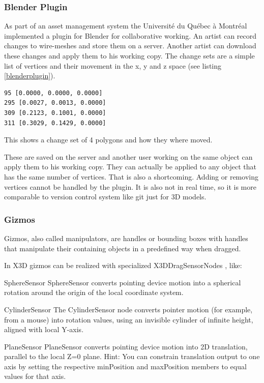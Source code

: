 \subsubsection{Blender Plugin}
\label{blender-plugin}

As part of an asset management system the Université du Québec à
Montréal implemented a plugin for Blender for collaborative working. An
artist can record changes to wire-meshes and store them on a server.
Another artist can download these changes and apply them to his working
copy. The change sets are a simple list of vertices and their movement in the
x, y and z space (see listing \ref{blenderplugin}). \cite{LCR07}

\begin{listing}
  \begin{verbatim}
95 [0.0000, 0.0000, 0.0000]
295 [0.0027, 0.0013, 0.0000]
309 [0.2123, 0.1001, 0.0000]
311 [0.3029, 0.1429, 0.0000]
  \end{verbatim}
  \caption{This shows a change set of 4 polygons and how they where moved.}
  \label{blenderplugin}
\end{listing}

These are saved on the server and another user working on the same
object can apply them to his working copy. They can actually be applied
to any object that has the same number of vertices. That is also a
shortcoming. Adding or removing vertices cannot be handled by the
plugin. It is also not in real time, so it is more comparable to version
control system like \gls{git} just for \gls{3D} models.

\subsubsection{Gizmos}\label{gizmos}

Gizmos, also called manipulators, are handles or bounding boxes with
handles that manipulate their containing objects in a predefined way when
dragged. \cite{wikigizmo}

In \gls{X3D} gizmos can be realized with specialized X3DDragSensorNodes \cite{x3ddragsensornode}, like:

\begin{description*}
\item[SphereSensor]
  SphereSensor converts pointing device motion into a spherical rotation around the origin of the local coordinate system. \cite{spheresensor}
\item[CylinderSensor]
  The CylinderSensor node converts pointer motion (for example, from a mouse) into rotation values, using an invisible cylinder of infinite height, aligned with local Y-axis. \cite{cylindersensor}
\item[PlaneSensor]
  PlaneSensor converts pointing device motion into 2D translation, parallel to the local Z=0 plane. Hint: You can constrain translation output to one axis by setting the respective minPosition and maxPosition members to equal values for that axis. \cite{planesensor}
\end{description*}

